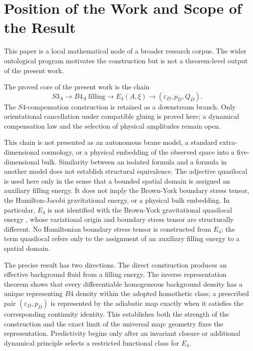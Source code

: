 \documentclass[11pt,a4paper]{article}
\def\Bfour{B4}%
\def\Sthree{S3}%
\def\Sfour{S4}%
\numberwithin{equation}{section}
\theoremstyle{remark}
\newcommand{\Sthree}{S^3}
\newcommand{\Sfour}{S^4}
\newcommand{\Bfour}{B^4}
\newcommand{\Efour}{E_4}
\newcommand{\epsD}{\varepsilon_D}
\newcommand{\pD}{p_D}
\newcommand{\QD}{Q_D}
\begin{document}
\tableofcontents

\section{Position of the Work and Scope of the Result}
This paper is a local mathematical node of a broader research corpus. The wider ontological program motivates the construction but is not a theorem-level output of the present work.

The proved core of the present work is the chain
\begin{equation}
\Sthree_A\longrightarrow \Bfour_A\ \text{filling}\longrightarrow \Efour(A,\xi)\longrightarrow (\epsD,\pD,\QD).
\end{equation}
The \(\Sfour\)-compensation construction is retained as a downstream branch. Only orientational cancellation under compatible gluing is proved here; a dynamical compensation law and the selection of physical amplitudes remain open.

This chain is not presented as an autonomous brane model, a standard extra-dimensional cosmology, or a physical embedding of the observed space into a five-dimensional bulk. Similarity between an isolated formula and a formula in another model does not establish structural equivalence. The adjective quasilocal is used here only in the sense that a bounded spatial domain is assigned an auxiliary filling energy. It does not imply the Brown-York boundary stress tensor, the Hamilton-Jacobi gravitational energy, or a physical bulk embedding. In particular, \(\Efour\) is not identified with the Brown-York gravitational quasilocal energy \cite{BrownYork1993}, whose variational origin and boundary stress tensor are structurally different. No Hamiltonian boundary stress tensor is constructed from \(\Efour\); the term quasilocal refers only to the assignment of an auxiliary filling energy to a spatial domain.

The precise result has two directions. The direct construction produces an effective background fluid from a filling energy. The inverse representation theorem shows that every differentiable homogeneous background density has a unique representing \(\Bfour\) density within the adopted homothetic class; a prescribed pair \((\epsD,\pD)\) is represented by the adiabatic map exactly when it satisfies the corresponding continuity identity. This establishes both the strength of the construction and the exact limit of the universal map: geometry fixes the representation. Predictivity begins only after an invariant closure or additional dynamical principle selects a restricted functional class for \(\Efour\).
\end{document}
